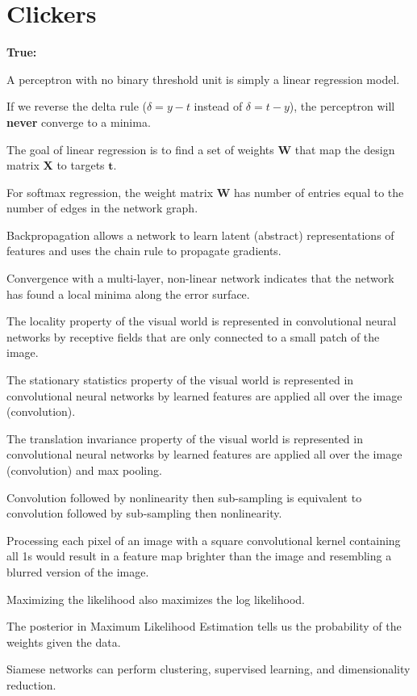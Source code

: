 \section{Clickers}

\textbf{True:}

A perceptron with no binary threshold unit is simply a linear regression model.

If we reverse the delta rule ($\delta = y - t$ instead of $\delta = t - y$), the perceptron will \textbf{never} converge to a minima.

The goal of linear regression is to find a set of weights $\mathbf{W}$ that map the design matrix $\mathbf{X}$ to targets $\mathbf{t}$.

For softmax regression, the weight matrix $\mathbf{W}$ has number of entries equal to the number of edges in the network graph.

Backpropagation allows a network to learn latent (abstract) representations of features and uses the chain rule to propagate gradients.

Convergence with a multi-layer, non-linear network indicates that the network has found a local minima along the error surface.

The locality property of the visual world is represented in convolutional neural networks by receptive fields that are only connected to a small patch of the image.

The stationary statistics property of the visual world is represented in convolutional neural networks by learned features are applied all over the image (convolution).

The translation invariance property of the visual world is represented in convolutional neural networks by learned features are applied all over the image (convolution) and max pooling.

Convolution followed by nonlinearity then sub-sampling is equivalent to  convolution followed by sub-sampling then nonlinearity.

Processing each pixel of an image with a square convolutional kernel containing all 1s would result in a feature map brighter than the image and resembling a blurred version of the image.

Maximizing the likelihood also maximizes the log likelihood.

The posterior in Maximum Likelihood Estimation tells us the probability of the weights given the data.

Siamese networks can perform clustering, supervised learning, and dimensionality reduction.

